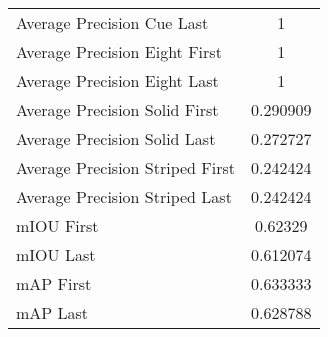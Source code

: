 \begin{figure}
\begin{subfigure}[b]{0.49\textwidth}
\begin{tabular}{|l|c|}
        Average Precision Cue Last & 1 \\
        Average Precision Eight First & 1 \\
        Average Precision Eight Last & 1 \\
        Average Precision Solid First & 0.290909 \\
        Average Precision Solid Last & 0.272727 \\
        Average Precision Striped First & 0.242424 \\
        Average Precision Striped Last & 0.242424 \\
        \hline
        mIOU First & 0.62329 \\
        mIOU Last & 0.612074 \\
        mAP First & 0.633333 \\
        mAP Last & 0.628788 \\
        \hline
    \end{tabular}
    
\end{subfigure}
\end{figure}

